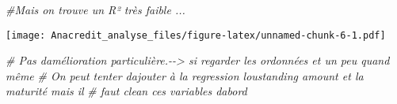\documentclass[
]{article}
\newenvironment{Shaded}{\begin{snugshade}}{\end{snugshade}}
\newcommand{\AttributeTok}[1]{\textcolor[rgb]{0.13,0.29,0.53}{#1}}
\newcommand{\CommentTok}[1]{\textcolor[rgb]{0.56,0.35,0.01}{\textit{#1}}}
\newcommand{\ConstantTok}[1]{\textcolor[rgb]{0.56,0.35,0.01}{#1}}
\newcommand{\FunctionTok}[1]{\textcolor[rgb]{0.13,0.29,0.53}{\textbf{#1}}}
\newcommand{\NormalTok}[1]{#1}
\newcommand{\OtherTok}[1]{\textcolor[rgb]{0.56,0.35,0.01}{#1}}
\newcommand{\SpecialCharTok}[1]{\textcolor[rgb]{0.81,0.36,0.00}{\textbf{#1}}}
\begin{document}
\begin{Shaded}
\begin{Highlighting}[]
\CommentTok{\#Mais on trouve un R² très faible ...}
\end{Highlighting}
\end{Shaded}

\begin{Shaded}
\end{Shaded}

\texttt{[image: Anacredit\_analyse\_files/figure-latex/unnamed-chunk-6-1.pdf]}

\begin{Shaded}
\begin{Highlighting}[]
\CommentTok{\# Pas d\textquotesingle{}amélioration particulière.{-}{-}\textgreater{} si regarder les ordonnées et un peu quand même}
\CommentTok{\# On peut tenter d\textquotesingle{}ajouter à la regression l\textquotesingle{}oustanding amount et la maturité mais il }
\CommentTok{\# faut clean ces variables d\textquotesingle{}abord}
\end{Highlighting}
\end{Shaded}
\end{document}
